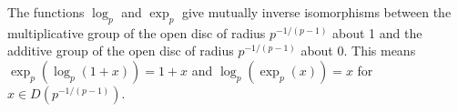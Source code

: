 The functions $\log_p$ and $\exp_p$ give mutually inverse isomorphisms between the multiplicative group of the open disc of radius $p^{-1/(p-1)}$ about 1 and the additive group of the open disc of radius $p^{-1/(p-1)}$ about 0. This means $\exp_p(\log_p(1+x)) = 1+x$ and $\log_p(\exp_p(x)) = x$ for $x \in D(p^{-1/(p-1)})$.